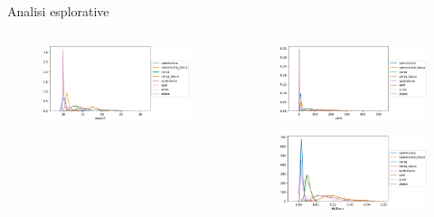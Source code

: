 \documentclass{beamer}
\begin{document}
\begin{frame}{Analisi esplorative}
\begin{columns}[T]
\begin{column}{.33\textwidth}
\begin{figure}[H]
\end{figure}
\begin{figure}[H]
\includegraphics[width=\textwidth]{../figure/meanA.png}
\end{figure}
\end{column}%
\hfill%
\begin{column}{.33\textwidth}
\begin{figure}[H]
\includegraphics[width=\textwidth]{../figure/varA.png}
\end{figure}
\begin{figure}[H]
\includegraphics[width=\textwidth]{../figure/MVDeriv.png}
\end{figure}
\end{column}%
\end{columns}
\end{frame}
\end{document}
